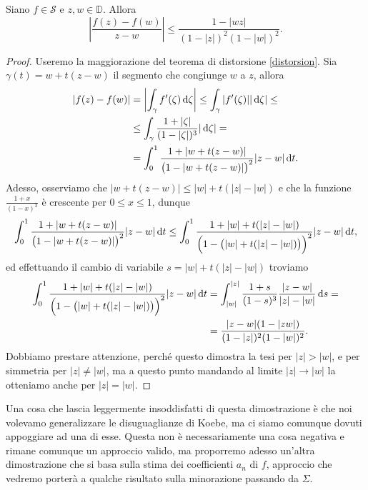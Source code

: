 \begin{thm}
  Siano $f \in \mathcal{S}$ e $z,w \in \mathbb{D}$. Allora
  \begin{equation}\label{maggiorazione}
    \left|\frac{f(z)-f(w)}{z-w}\right| \le \frac{1-|wz|}{(1-|z|)^2(1-|w|)^2}.
  \end{equation}
\end{thm}

\begin{proof}
  Useremo la maggiorazione del teorema di distorsione \eqref{distorsion}. Sia $\gamma(t)=w+t(z-w)$ il segmento che congiunge $w$ a $z$, allora
  \begin{align*}
    |f(z)-f(w)|&=\left|\int_{\gamma}f'(\zeta)\mathop{}\!\mathrm{d}\zeta\right| \le \int_{\gamma} |f'(\zeta)||\mathop{}\!\mathrm{d}\zeta| \le \\
    & \le \int_{\gamma} \frac{1+|\zeta|}{(1-|\zeta|)^3}|\mathop{}\!\mathrm{d}\zeta|= \\
    &=\int_0^1 \frac{1+|w+t(z-w)|}{\big(1-|w+t(z-w)|\big)^2}|z-w|\mathop{}\!\mathrm{d} t.
  \end{align*}
  Adesso, osserviamo che $|w+t(z-w)| \le |w|+t(|z|-|w|)$ e che la funzione $\frac{1+x}{(1-x)^3}$ è crescente per $0 \le x \le 1$, dunque
  \begin{gather*}
    \int_0^1 \frac{1+|w+t(z-w)|}{\big(1-|w+t(z-w)|\big)^2}|z-w|\mathop{}\!\mathrm{d} t \le \int_0^1 \frac{1+|w|+t(|z|-|w|)}{\Big(1-\big(|w|+t(|z|-|w|)\big)\Big)^2}|z-w|\mathop{}\!\mathrm{d} t,
  \end{gather*}
  ed effettuando il cambio di variabile $s=|w|+t(|z|-|w|)$ troviamo
  \begin{align*}
    \int_0^1 \frac{1+|w|+t(|z|-|w|)}{\Big(1-\big(|w|+t(|z|-|w|)\big)\Big)^2}|z-w|\mathop{}\!\mathrm{d} t &=\int_{|w|}^{|z|} \frac{1+s}{(1-s)^3}\frac{|z-w|}{|z|-|w|}\mathop{}\!\mathrm{d} s=\\
    &=\frac{|z-w|(1-|zw|)}{(1-|z|)^2(1-|w|)^2}.
  \end{align*}
  Dobbiamo prestare attenzione, perché questo dimostra la tesi per $|z|>|w|$, e per simmetria per $|z|\not=|w|$, ma a questo punto mandando al limite $|z| \longrightarrow |w|$ la otteniamo anche per $|z|=|w|$.
\end{proof}

Una cosa che lascia leggermente insoddisfatti di questa dimostrazione è che noi volevamo generalizzare le disuguaglianze di Koebe, ma ci siamo comunque dovuti appoggiare ad una di esse. Questa non è necessariamente una cosa negativa e rimane comunque un approccio valido, ma proporremo adesso un'altra dimostrazione che si basa sulla stima dei coefficienti $a_n$ di $f$, approccio che vedremo porterà a qualche risultato sulla minorazione passando da $\Sigma$.

